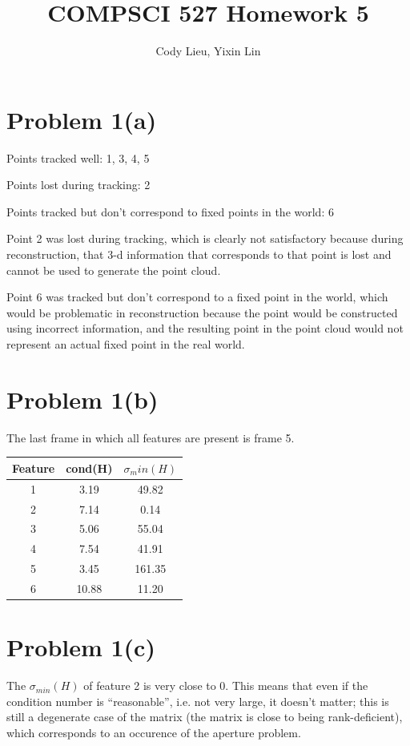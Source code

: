 \documentclass{article}
\author{Cody Lieu, Yixin Lin}
\title{COMPSCI 527 Homework 5}
\begin{document}
\maketitle

\section*{Problem 1(a)}

Points tracked well: 1, 3, 4, 5

Points lost during tracking: 2

Points tracked but don't correspond to fixed points in the world: 6

Point 2 was lost during tracking, which is clearly not satisfactory because during reconstruction, that 3-d information that corresponds to that point is lost and cannot be used to generate the point cloud.

Point 6 was tracked but don't correspond to a fixed point in the world, which would be problematic in reconstruction because the point would be constructed using incorrect information, and the resulting point in the point cloud would not represent an actual fixed point in the real world.

\section*{Problem 1(b)}

The last frame in which all features are present is frame 5.

\begin{center}
\begin{tabular}{ ||c|c|c|| } 
	\hline
	Feature & cond(H) & $\sigma_min(H)$ \\ \hline
 	1 &3.19 &49.82 \\ 
	2 &7.14 &0.14 \\
	3 &5.06 &55.04 \\
	4 &7.54 &41.91 \\
	5 &3.45 &161.35 \\
	6 &10.88 &11.20 \\
\hline
\end{tabular}
\end{center}

\section*{Problem 1(c)}
The $\sigma_{min}(H)$ of feature 2 is very close to 0. This means that even if the condition number is ``reasonable'', i.e. not very large, it doesn't matter; this is still a degenerate case of the matrix (the matrix is close to being rank-deficient), which corresponds to an occurence of the aperture problem.
\end{document}
